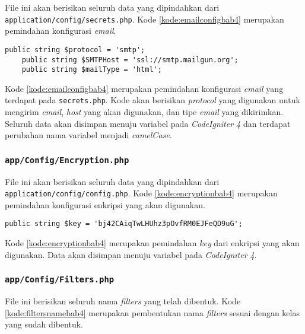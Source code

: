 File ini akan berisikan seluruh data yang dipindahkan dari \texttt{application/config/secrets.php}. Kode \ref{kode:emailconfigbab4} merupakan pemindahan konfigurasi \textit{email}.

\begin{lstlisting}[caption=Pemindahan \texttt{app/config/secrets.php} menuju \texttt{Email.php}, label=kode:emailconfigbab4]
    public string $protocol = 'smtp';
    public string $SMTPHost = 'ssl://smtp.mailgun.org';
    public string $mailType = 'html';
\end{lstlisting}

Kode \ref{kode:emailconfigbab4} merupakan pemindahan konfigurasi \textit{email} yang terdapat pada \texttt{secrets.php}. Kode akan berisikan \textit{protocol} yang digunakan untuk mengirim \textit{email}, \textit{host} yang akan digunakan, dan tipe \textit{email} yang dikirimkan. Seluruh data akan disimpan menuju variabel pada \textit{CodeIgniter 4} dan terdapat perubahan nama variabel menjadi \textit{camelCase}.

\subsubsection{\texttt{app/Config/Encryption.php}}
File ini akan berisikan seluruh data yang dipindahkan dari \texttt{application/config/config.php}. Kode \ref{kode:encryptionbab4} merupakan pemindahan konfigurasi enkripsi yang akan digunakan.

\begin{lstlisting}[caption=Pemindahan \texttt{app/config/config.php} menuju \texttt{Encryption.php}, label=kode:encryptionbab4]
    public string $key = 'bj42CAiqTwLHUhz3pOvfRM0EJFeQD9uG';
\end{lstlisting}

Kode \ref{kode:encryptionbab4} merupakan pemindahan \textit{key} dari enkripsi yang akan digunakan. Data akan disimpan menuju variabel pada \textit{CodeIgniter 4}.

\subsubsection{\texttt{app/Config/Filters.php}}
\label{subsubsec:filters}
File ini berisikan seluruh nama \textit{filters} yang telah dibentuk. Kode \ref{kode:filtersnamebab4} merupakan pembentukan nama \textit{filters} sesuai dengan kelas yang sudah dibentuk.

